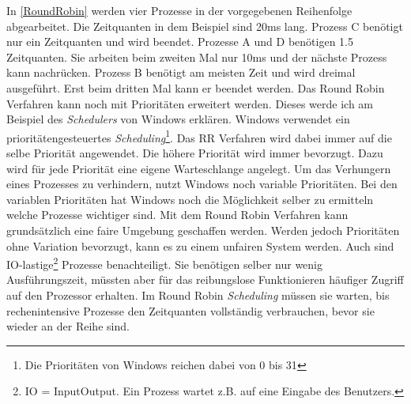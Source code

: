 In \ref{RoundRobin} werden vier Prozesse in der vorgegebenen Reihenfolge abgearbeitet. Die Zeitquanten in dem Beispiel sind 20ms lang. Prozess C benötigt nur ein Zeitquanten und wird beendet. Prozesse A und D benötigen 1.5 Zeitquanten. Sie arbeiten beim zweiten Mal nur 10ms und der nächste Prozess kann nachrücken. Prozess B benötigt am meisten Zeit und wird dreimal ausgeführt. Erst beim dritten Mal kann er beendet werden.
\medskip
\newline
Das Round Robin Verfahren kann noch mit Prioritäten erweitert werden. Dieses werde ich am Beispiel des \textit{Schedulers} von Windows erklären. Windows verwendet ein prioritätengesteuertes \textit{Scheduling}\footnote{Die Prioritäten von Windows reichen dabei von 0 bis 31}. Das RR Verfahren wird dabei immer auf die selbe Priorität angewendet. Die höhere Priorität wird immer bevorzugt. Dazu wird für jede Priorität eine eigene Warteschlange angelegt. Um das Verhungern eines Prozesses zu verhindern, nutzt Windows noch variable Prioritäten. Bei den variablen Prioritäten hat Windows noch die Möglichkeit selber zu ermitteln welche Prozesse wichtiger sind.\cite[Folie 9-12]{Windows:Lohmann}
\medskip
\newline
Mit dem Round Robin Verfahren kann grundsätzlich eine faire Umgebung geschaffen werden. Werden jedoch Prioritäten ohne Variation bevorzugt, kann es zu einem unfairen System werden. Auch sind I\/O-lastige\footnote{I\/O = Input\/Output. Ein Prozess wartet z.B. auf eine Eingabe des Benutzers.} Prozesse benachteiligt. Sie benötigen selber nur wenig Ausführungszeit, müssten aber für das reibungslose Funktionieren häufiger Zugriff auf den Prozessor erhalten. Im Round Robin \textit{Scheduling} müssen sie warten, bis rechenintensive Prozesse den Zeitquanten vollständig verbrauchen, bevor sie wieder an der Reihe sind.

